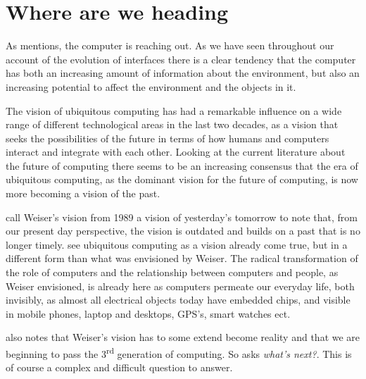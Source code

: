 \section{Where are we heading}
As \citet{grudin1990computer} mentions, the computer is reaching out.
As we have seen throughout our account of the evolution of interfaces there is a clear tendency that the computer has both an increasing amount of information about the environment, but also an increasing potential to affect the environment and the objects in it.  

The vision of ubiquitous computing has had a remarkable influence on a wide range of different technological areas in the last two decades, as a vision that seeks the possibilities of the future in terms of how humans and computers interact and integrate with each other.
Looking at the current literature about the future of computing there seems to be an increasing consensus that the era of ubiquitous computing, as the dominant vision for the future of computing, is now more becoming a vision of the past.

\citet{bell2007yesterday} call Weiser's vision from 1989 a vision of yesterday's tomorrow to note that, from our present day perspective, the vision is outdated and builds on a past that is no longer timely.
\citeauthor{bell2007yesterday} see ubiquitous computing as a vision already come true, but in a different form than what was envisioned by Weiser.
The radical transformation of the role of computers and the relationship between computers and people, as Weiser envisioned, is already here as computers permeate our everyday life, both invisibly, as almost all electrical objects today have embedded chips, and visible in mobile phones, laptop and desktops, GPS's, smart watches ect.

\citet{abowd2012next} also notes that Weiser's vision has to some extend become reality and that we are beginning to pass the 3\textsuperscript{rd} generation of computing.
So \citeauthor{abowd2012next} asks \textit{what's next?}.
This is of course a complex and difficult question to answer.

